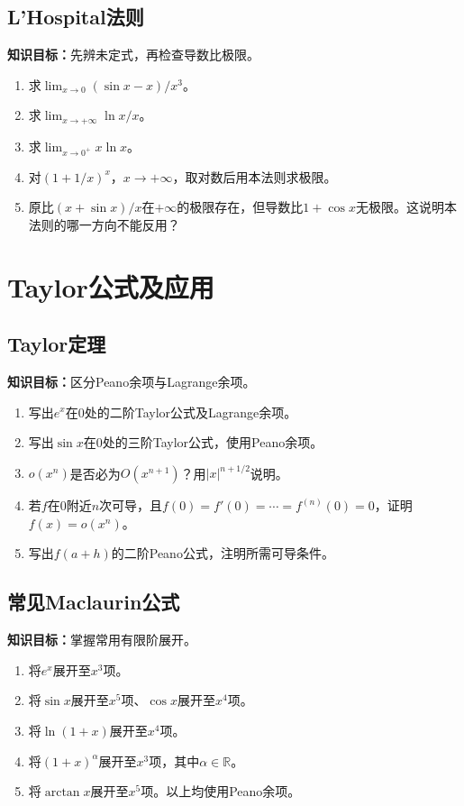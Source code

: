 \documentclass[11pt,a4paper,fontset=fandol]{ctexrep}
\newcommand{\goal}[1]{\textbf{知识目标：}#1\par}
\begin{document}
\subsection{L'Hospital法则}
\goal{先辨未定式，再检查导数比极限。}
\begin{enumerate}
\item 求$\lim_{x\to0}(\sin x-x)/x^3$。
\item 求$\lim_{x\to+\infty}\ln x/x$。
\item 求$\lim_{x\to0^+}x\ln x$。
\item 对$(1+1/x)^x$，$x\to+\infty$，取对数后用本法则求极限。
\item 原比$(x+\sin x)/x$在$+\infty$的极限存在，但导数比$1+\cos x$无极限。这说明本法则的哪一方向不能反用？
\end{enumerate}
\section{Taylor公式及应用}
\subsection{Taylor定理}
\goal{区分Peano余项与Lagrange余项。}
\begin{enumerate}
\item 写出$e^x$在0处的二阶Taylor公式及Lagrange余项。
\item 写出$\sin x$在0处的三阶Taylor公式，使用Peano余项。
\item $o(x^n)$是否必为$O(x^{n+1})$？用$|x|^{n+1/2}$说明。
\item 若$f$在0附近$n$次可导，且$f(0)=f'(0)=\cdots=f^{(n)}(0)=0$，证明$f(x)=o(x^n)$。
\item 写出$f(a+h)$的二阶Peano公式，注明所需可导条件。
\end{enumerate}
\subsection{常见Maclaurin公式}
\goal{掌握常用有限阶展开。}
\begin{enumerate}
\item 将$e^x$展开至$x^3$项。
\item 将$\sin x$展开至$x^5$项、$\cos x$展开至$x^4$项。
\item 将$\ln(1+x)$展开至$x^4$项。
\item 将$(1+x)^\alpha$展开至$x^3$项，其中$\alpha\in\mathbb R$。
\item 将$\arctan x$展开至$x^5$项。以上均使用Peano余项。
\end{enumerate}
\end{document}
